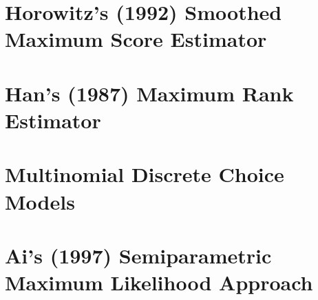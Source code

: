 \documentclass[xcolor=svgnames,dvipdfmx,cjk]{beamer}
\theoremstyle{example}
\begin{document}
  
  
  
  
  
  
  
\section{Horowitz's (1992) Smoothed Maximum Score Estimator}
  
  
  
  
  
  
  
  
  
  
\section{Han's (1987) Maximum Rank Estimator}
  
  
  
  
  
  
  
  
  
\section{Multinomial Discrete Choice Models}
  
  
  
  
  
  
  
  
\section{Ai's (1997) Semiparametric Maximum Likelihood Approach}
  
  
  
  
  
  
  
  
  
\end{document}
